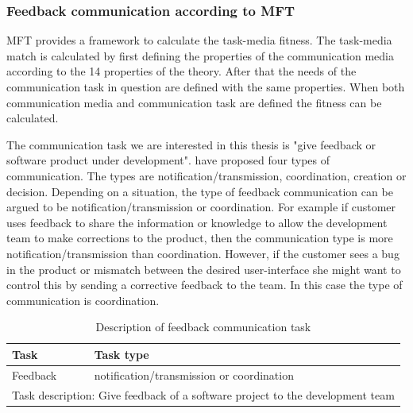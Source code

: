\documentclass[english,12pt,a4paper,pdftex]{article}
\begin{document}
\subsubsection{Feedback communication according to MFT}
\label{sec:feedback_mft}

\ac{MFT} provides a framework to calculate the task-media fitness. The task-media match is calculated by first defining the properties of the communication media according to the 14 properties of the theory. After that the needs of the communication task in question are defined with the same properties. When both communication media and communication task are defined the fitness can be calculated.

The communication task we are interested in this thesis is "give feedback or software product under development". \citet{nakamura1995} have proposed four types of communication. The types are notification/transmission, coordination, creation or decision. Depending on a situation, the type of feedback communication can be argued to be notification/transmission or coordination. For example if customer uses feedback to share the information or knowledge to allow the development team to make corrections to the product, then the communication type is more notification/transmission than coordination. However, if the customer sees a bug in the product or mismatch between the desired user-interface she might want to control this by sending a corrective feedback to the team. In this case the type of communication is coordination.

\begin{table}[!h]
\renewcommand{\arraystretch}{1.3}
\caption{Description of feedback communication task}
\label{table:description_feedback_communication_task}
\centering
\begin{tabular}{|p{7cm}|p{7cm}|}
\hline
\textbf{Task} & \textbf{Task type}\\
\hline
Feedback & notification/transmission or coordination\\
\hline
\multicolumn{2}{|l|}{Task description:
Give feedback of a software project to the development team} \\ \hline
\end{tabular}
\end{table}
\end{document}
